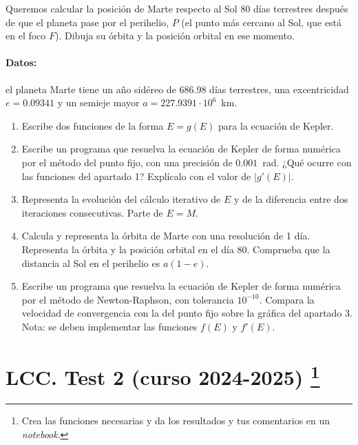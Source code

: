 Queremos calcular la posición de Marte respecto al Sol 80 días terrestres después de que el planeta pase por el perihelio, $P$ (el punto más cercano al Sol, que está en el foco $F$). Dibuja su órbita y la posición orbital en ese momento.
\paragraph{Datos:} el planeta Marte tiene un año sidéreo de $686.98$ días terrestres, una excentricidad $e=0.09341$ y un semieje mayor $a= 227.9391 \cdot 10^6 $~km.

\begin{enumerate}
    \item Escribe dos funciones de la forma $E=g(E)$ para la ecuación de Kepler.
    \item Escribe un programa que resuelva la ecuación de Kepler de forma numérica por el método del punto fijo, con una precisión de $0.001$~rad. ¿Qué ocurre con las funciones del apartado 1? Explícalo con el valor de $\vert g'(E)\vert$.
    \item Representa la evolución del cálculo iterativo de $E$ y de la diferencia entre dos iteraciones consecutivas. Parte de $E=M$.
    \item Calcula y representa la órbita de Marte con una resolución de 1 día. Representa la órbita y la posición orbital en el día $80$. Comprueba que la distancia al Sol en el perihelio es $a(1-e)$.
    \item Escribe un programa que resuelva la ecuación de Kepler de forma numérica por el método de Newton-Raphson, con tolerancia $10^{-10}$. Compara la velocidad de convergencia con la del punto fijo sobre la gráfica del apartado 3. Nota: se deben implementar las funciones $f(E)$ y $f'(E)$.
\end{enumerate}

\section{LCC. Test 2 (curso 2024-2025) \protect\footnote{Crea las funciones necesarias y da los resultados y tus comentarios en un \emph{notebook}.}}

